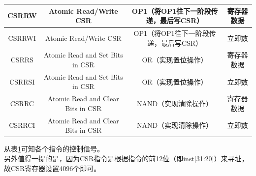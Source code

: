 \documentclass[UTF8]{article}
\begin{document}
\begin{enumerate}
\begin{table}[H]
{\begin{tabular}{|c||c|c||c|}
                    \hline
                    CSRRW & Atomic Read/Write CSR & OP1（将OP1往下一阶段传递，最后写CSR） & 寄存器数据 \\
                    \hline
                    CSRRWI & Atomic Read/Write CSR & OP1（将OP1往下一阶段传递，最后写CSR） & 立即数 \\
                    \hline
                    CSRRS & Atomic Read and Set Bits in CSR & OR（实现置位操作） & 寄存器数据 \\
                    \hline
                    CSRRSI & Atomic Read and Set Bits in CSR & OR（实现置位操作） & 立即数 \\
                    \hline
                    CSRRC & Atomic Read and Clear Bits in CSR & NAND（实现清除操作） & 寄存器数据 \\
                    \hline
                    CSRRCI & Atomic Read and Clear Bits in CSR & NAND（实现清除操作） & 立即数 \\
                    \hline
                \end{tabular}
            }
            \label{csr table}
        \end{table}
        从表\ref{csr table}可知各个指令的控制信号。 \\
        另外值得一提的是，因为CSR指令是根据指令的前12位（即{\jetbrains inst[31:20]}）来寻址，
        故CSR寄存器设置4096个即可。
    \end{enumerate}
\end{document}
